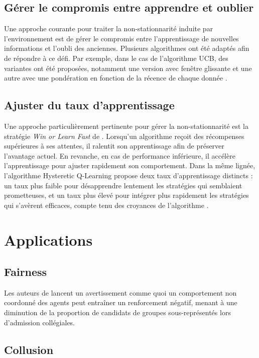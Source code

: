 \documentclass{article}
\theoremstyle{definition}
\begin{document}
\subsection{Gérer le compromis entre apprendre et oublier}
Une approche courante pour traiter la non-stationnarité induite par l’environnement est de gérer le compromis entre l’apprentissage de nouvelles informations et l’oubli des anciennes. Plusieurs algorithmes ont été adaptés afin de répondre à ce défi. Par exemple, dans le cas de l’algorithme UCB, des variantes ont été proposées, notamment une version avec fenêtre glissante et une autre avec une pondération en fonction de la récence de chaque donnée \citet{garivier_upper-confidence_2008}.

\subsection{Ajuster du taux d'apprentissage}
Une approche particulièrement pertinente pour gérer la non-stationnarité est la stratégie \textit{Win or Learn Fast} de \citet{bowling_multiagent_2002}. Lorsqu’un algorithme reçoit des récompenses supérieures à ses attentes, il ralentit son apprentissage afin de préserver l’avantage actuel. En revanche, en cas de performance inférieure, il accélère l’apprentissage pour ajuster rapidement son comportement.
Dans la même lignée, l’algorithme Hysteretic Q-Learning propose deux taux d’apprentissage distincts : un taux plus faible pour désapprendre lentement les stratégies qui semblaient prometteuses, et un taux plus élevé pour intégrer plus rapidement les stratégies qui s’avèrent efficaces, compte tenu des croyances de l’algorithme \citet{matignon_hysteretic_2007}.


\section{Applications}

\subsection{Fairness}

Les auteurs de \citet{puranik_long-term_2024} lancent un avertissement comme quoi un comportement non coordonné des agents peut entraîner un renforcement négatif, menant à une diminution de la proportion de candidats de groupes sous-représentés lors d'admission collégiales. 

\subsection{Collusion}
\end{document}
